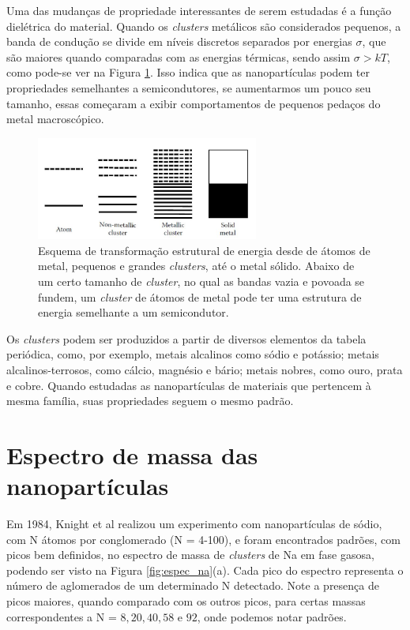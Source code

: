 Uma das mudanças de propriedade interessantes de serem estudadas é a função dielétrica do material. Quando os \textit{clusters} metálicos são considerados pequenos, a banda de condução se divide em níveis discretos separados por energias $\sigma$, que são maiores quando comparadas com as energias térmicas, sendo assim $\sigma>kT$, como pode-se ver na Figura \ref{fig:carac_metal}. Isso indica que as nanopartículas podem ter propriedades semelhantes a semicondutores, se aumentarmos um pouco seu tamanho, essas começaram a exibir comportamentos de pequenos pedaços do metal macroscópico.

\begin{figure}
  \centering
  \includegraphics[width=0.65\textwidth]{images/clusters/carac_metal}
  \caption{ Esquema de transformação estrutural de energia desde de átomos de metal, pequenos e grandes \textit{clusters}, até o metal sólido. Abaixo de um certo tamanho de \textit{cluster}, no qual as bandas vazia e povoada se fundem, um \textit{cluster} de átomos de metal pode ter uma estrutura de energia semelhante a um semicondutor.\cite{dissertacao_anderson}  }
  \label{fig:carac_metal}
\end{figure}

Os \textit{clusters} podem ser produzidos a partir de diversos elementos da tabela periódica, como, por exemplo, metais alcalinos como sódio e potássio; metais alcalinos-terrosos, como cálcio, magnésio e bário; metais nobres, como ouro, prata  e cobre. Quando estudadas as nanopartículas de materiais que pertencem à mesma família, suas propriedades seguem o mesmo padrão.


\section{Espectro de massa das nanopartículas}
\label{sec:experimentos_teo}


Em 1984, Knight et al \cite{electronic_Shell_sodium} realizou um experimento com nanopartículas de sódio, com N átomos por conglomerado (N = 4-100), e foram encontrados padrões, com picos bem definidos, no espectro de massa de \textit{clusters} de Na em fase gasosa, podendo ser visto na Figura \ref{fig:espec_na}(a). Cada pico do espectro representa o número de 
aglomerados de um determinado N detectado. Note a presença de picos maiores, quando comparado com os outros picos, para certas massas correspondentes a N = $8, 20, 40, 58$ e $92$, onde podemos notar padrões. 




